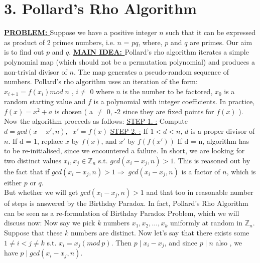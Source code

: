 \documentclass[11pt]{article}
\begin{document}
\section*{3. Pollard's Rho Algorithm}
    \begin{flushleft}
    \textbf{\underline{PROBLEM: }} Suppose we have a positive integer $n$ such that it can be expressed as product of 2 primes numbers, i.e. $n$ = $pq$, where, $p$ and $q$ are primes.
    Our aim is to find out $p$ and $q$.
    \break \break
    \textbf{\underline{MAIN IDEA: }}\break
        Pollard's rho algorithm iterates a simple polynomial map (which should not be a permutation polynomial) and produces a non-trivial divisor of $n$. The map generates a pseudo-random sequence of numbers. \break
        Pollard's rho algorithm uses an iteration of the form:\quad \quad
        $x_{i+1}=f\left( x_{i}\right) mod \; n$ \quad , $i \neq$ 0   
        where $n$ is the number to be factored, $x_{0}$ is a random starting value and $f$ is a polynomial with integer coefficients.
        In practice, $f\left( x\right) = x^{2}+a$ is chosen ( a $\neq$ 0, -2 since they are fixed points for $f\left( x\right) $ ). \break \break
        Now the algorithm proceeds as follows: \break
        \underline{STEP 1. :} Compute $d = gcd\left( x-x',n\right) ,\;\; x'=f\left( x\right) $ \break
        \underline{STEP 2. :} If $1 < d < n$, $d$ is a proper divisor of $n$.
         \break \quad If d = 1, replace $x$ by $f\left( x\right)$, and $x'$ by $f\left(f\left( x'\right)\right)$ \break
        If d = n, algorithm has to be re-initialised, since we encountered a failure.
         \break \break
        In short, we are looking for two distinct values $x_{i},x_{j}\in \mathbb{Z} _{n}$ s.t. $gcd\left( x_{i}-x_{j},n\right)  >1$. This is reasoned out by the fact that if $gcd\left( x_{i}-x_{j},n\right)  >1 \Rightarrow \; gcd\left( x_{i}-x_{j},n\right)$ is a factor of $n$, which is either $p$ or $q$.\\
        But whether we will get $gcd\left( x_{i}-x_{j},n\right)  >1$ and that too in reasonable number of steps is answered by the Birthday Paradox. In fact, Pollard's Rho Algorithm can be seen as a re-formulation of Birthday Paradox Problem, which we will discuss now: \break \break
        Now say we pick $k$ numbers $x_{1},x_{2},\ldots ,x_{k}$ uniformly at random in  $\mathbb{Z} _{n}$. Suppose that these $k$ numbers are distinct. Now let's say that there exists some $1\neq i < j \neq k$ s.t. $x_{i}=x_{j}\left( mod\:p\right) $. Then $p\;|\;x_{i}-x_{j}$, and since $p\;|\;n$ also , we have $p\;|\;gcd\left( x_{i}-x_{j},n\right)$. \break

\end{flushleft}
\end{document}
